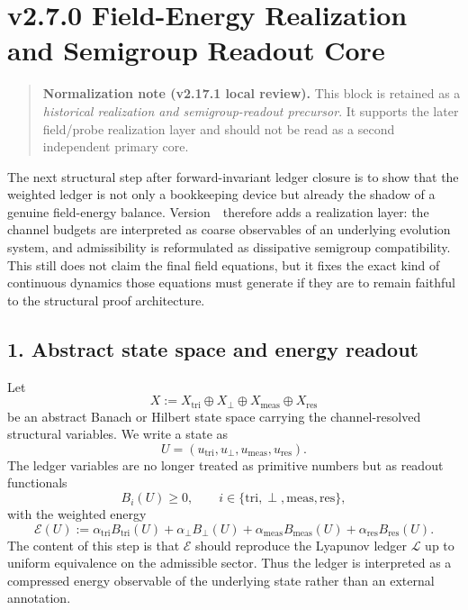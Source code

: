 \section*{v2.7.0 Field-Energy Realization and Semigroup Readout Core}

\begin{quote}
\textbf{Normalization note (v2.17.1 local review).}
This block is retained as a \emph{historical realization and semigroup-readout precursor}. It supports the later field/probe realization layer and should not be read as a second independent primary core.
\end{quote}

The next structural step after forward-invariant ledger closure is to show that the
weighted ledger is not only a bookkeeping device but already the shadow of a genuine
field-energy balance. Version~\docversion\ therefore adds a realization layer: the
channel budgets are interpreted as coarse observables of an underlying evolution
system, and admissibility is reformulated as dissipative semigroup compatibility.
This still does not claim the final field equations, but it fixes the exact kind of
continuous dynamics those equations must generate if they are to remain faithful to
the structural proof architecture.

\subsection*{1. Abstract state space and energy readout}
Let
\[
X := X_{\mathrm{tri}}\oplus X_{\perp}\oplus X_{\mathrm{meas}}\oplus X_{\mathrm{res}}
\]
be an abstract Banach or Hilbert state space carrying the channel-resolved structural
variables. We write a state as
\[
U=(u_{\mathrm{tri}},u_{\perp},u_{\mathrm{meas}},u_{\mathrm{res}}).
\]
The ledger variables are no longer treated as primitive numbers but as readout
functionals
\[
B_i(U)\ge 0,
\qquad i\in\{\mathrm{tri},\perp,\mathrm{meas},\mathrm{res}\},
\]
with the weighted energy
\[
\mathcal E(U):=\alpha_{\mathrm{tri}}B_{\mathrm{tri}}(U)
+\alpha_{\perp}B_{\perp}(U)
+\alpha_{\mathrm{meas}}B_{\mathrm{meas}}(U)
+\alpha_{\mathrm{res}}B_{\mathrm{res}}(U).
\]
The content of this step is that $\mathcal E$ should reproduce the Lyapunov ledger
$\mathcal L$ up to uniform equivalence on the admissible sector. Thus the ledger is
interpreted as a compressed energy observable of the underlying state rather than an
external annotation.

